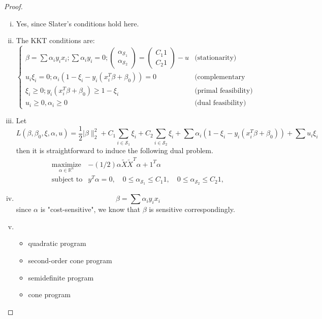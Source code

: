 \documentclass{article}
\theoremstyle{remark}
\theoremstyle{definition}
\newcommand{\maximize}{\mathop{\mathrm{maximize}}}
\newcommand{\maximizewrt}[1]{\underset{#1}{\maximize}}
\newcommand{\subjectto}{\mbox{subject to}}
\newcommand{\ones}{\mathrm 1}
\newcommand{\reals}{\mathbb R}
\begin{document}
\begin{proof}
\begin{enumerate}[(i)]
\item Yes, since Slater's conditions hold here.
\item The KKT conditions are:
    \[  \left \{ \begin{array}{cc}
        \beta = \sum \alpha_i y_ix_i; \sum \alpha_i y_i=0;\left( \begin{array}{c}
            \alpha_{\mathcal{S}_1} \\
            \alpha_{\mathcal{S}_2} \end{array}\right)=\left( \begin{array}{c}
                C_1 1\\
                C_2 1 \end{array}\right )-u &  \text{(stationarity)}\\
     u_i\xi_i=0; \alpha_i(1-\xi_i-y_i(x_i^T\beta +\beta_0))=0 &\text{(complementary slackness)} \\
     \xi_i \geq 0; y_i(x_i^T\beta +\beta_0)\geq 1-\xi_i & \text{(primal feasibility)}\\
    u_i\geq 0, \alpha_i\geq 0 &\text{(dual feasibility)}
       \end{array} \right. \]
\item Let \[L(\beta,\beta_0,\xi,\alpha,u)=\frac{1}{2}| \beta \|_2^2 + C_1 \sum_{i \in \mathcal{S}_1} \xi_i + C_2    \sum_{i \in \mathcal{S}_2} \xi_i +\sum \alpha_i(1-\xi_i-y_i(x_i^T\beta+\beta_0))+\sum u_i\xi_i\]
      then it is straightforward to induce the following dual problem. 
      \begin{equation*}
      \begin{array}{ll}
      \maximizewrt{\alpha \in \reals^n} & -(1/2) \alpha \tilde X \tilde X^T \alpha + \ones^T \alpha \\
      \subjectto & y^T \alpha = 0, \quad 0 \leq \alpha_{\mathcal{S}_1} \leq C_1 \ones, \quad 0 \leq \alpha_{\mathcal{S}_2} \leq C_2 \ones,
     \end{array}
     \label{eq:svm:dual}
     \end{equation*}
\item $$\beta=\sum \alpha_iy_ix_i$$
      since $\alpha$ is "cost-sensitive", we know that $\beta$ is sensitive correspondingly.
\item \begin{itemize}
    \item quadratic program
    \item second-order cone program
    \item semidefinite program
    \item cone program
     \end{itemize}
\end{enumerate}
\end{proof}
\end{document}
